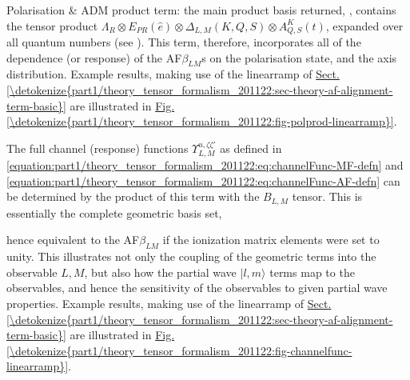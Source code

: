 \documentclass[letterpaper,table,10pt,english]{jupyterBook}
\begin{document}
\sphinxAtStartPar
Polarisation \& ADM product term: the main product basis returned, , contains the tensor product \(\Lambda_{R}\otimes E_{PR}(\hat{e})\otimes \Delta_{L,M}(K,Q,S)\otimes A^{K}_{Q,S}(t)\), expanded over all quantum numbers (see ). This term, therefore, incorporates all of the dependence (or response) of the AF\sphinxhyphen{}\(\beta_{LM}\)s on the polarisation state, and the axis distribution. Example results, making use of the linear\sphinxhyphen{}ramp {\hyperref[\detokenize{backmatter/glossary:term-ADMs}]{}} of \hyperref[\detokenize{part1/theory_tensor_formalism_201122:sec-theory-af-alignment-term-basic}]{Sect.\@ \ref{\detokenize{part1/theory_tensor_formalism_201122:sec-theory-af-alignment-term-basic}}} are illustrated in \hyperref[\detokenize{part1/theory_tensor_formalism_201122:fig-polprod-linearramp}]{Fig.\@ \ref{\detokenize{part1/theory_tensor_formalism_201122:fig-polprod-linearramp}}}.

\sphinxAtStartPar
The full channel (response) functions \(\varUpsilon_{L,M}^{u,\zeta\zeta'}\) as defined in \eqref{equation:part1/theory_tensor_formalism_201122:eq:channelFunc-MF-defn} and \eqref{equation:part1/theory_tensor_formalism_201122:eq:channelFunc-AF-defn} can be determined by the product of this term with the \(B_{L,M}\) tensor. This is essentially the complete geometric basis set,

\sphinxAtStartPar
hence equivalent to the AF\sphinxhyphen{}\(\beta_{LM}\) if the ionization matrix elements were set to unity. This illustrates not only the coupling of the geometric terms into the observable \(L,M\), but also how the partial wave \(|l,m\rangle\) terms map to the observables, and hence the sensitivity of the observables to given partial wave properties. Example results, making use of the linear\sphinxhyphen{}ramp {\hyperref[\detokenize{backmatter/glossary:term-ADMs}]{}} of \hyperref[\detokenize{part1/theory_tensor_formalism_201122:sec-theory-af-alignment-term-basic}]{Sect.\@ \ref{\detokenize{part1/theory_tensor_formalism_201122:sec-theory-af-alignment-term-basic}}} are illustrated in \hyperref[\detokenize{part1/theory_tensor_formalism_201122:fig-channelfunc-linearramp}]{Fig.\@ \ref{\detokenize{part1/theory_tensor_formalism_201122:fig-channelfunc-linearramp}}}.
\end{document}

